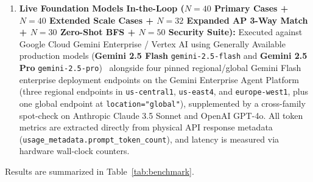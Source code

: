 \documentclass[conference,10pt]{IEEEtran}
\begin{document}
\begin{enumerate}
    \item \textbf{Live Foundation Models In-the-Loop ($N = 40$ Primary Cases + $N = 40$ Extended Scale Cases + $N = 32$ Expanded AP 3-Way Match + $N = 30$ Zero-Shot BFS + $N = 50$ Security Suite):} Executed against Google Cloud Gemini Enterprise / Vertex AI using Generally Available production models (\textbf{Gemini 2.5 Flash} \texttt{gemini-2.5-flash} and \textbf{Gemini 2.5 Pro} \texttt{gemini-2.5-pro})~\cite{gemini2025report} alongside four pinned regional/global Gemini Flash enterprise deployment endpoints on the Gemini Enterprise Agent Platform (three regional endpoints in \texttt{us-central1}, \texttt{us-east4}, and \texttt{europe-west1}, plus one global endpoint at \texttt{location="global"}), supplemented by a cross-family spot-check on Anthropic Claude 3.5 Sonnet and OpenAI GPT-4o. All token metrics are extracted directly from physical API response metadata (\texttt{usage\_metadata.prompt\_token\_count}), and latency is measured via hardware wall-clock counters.
\end{enumerate}

Results are summarized in Table~\ref{tab:benchmark}.
\end{document}
